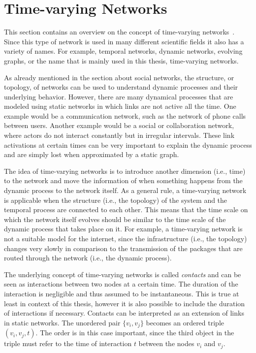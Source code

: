 \section{Time-varying Networks}
\label{sec:time-varying-networks}

This section contains an overview on the concept of time-varying networks~\cite{Holme2012, Holme2015}.
Since this type of network is used in many different scientific fields it also has a variety of names.
For example, temporal networks, dynamic networks, evolving graphs, or the name that is mainly used in this thesis, time-varying networks.

As already mentioned in the section about social networks, the structure, or topology, of networks can be used to understand dynamic processes and their underlying behavior.
However, there are many dynamical processes that are modeled using static networks in which links are not active all the time.
One example would be a communication network, such as the network of phone calls between users.
Another example would be a social or collaboration network, where actors do not interact constantly but in irregular intervals.
These link activations at certain times can be very important to explain the dynamic process and are simply lost when approximated by a static graph.

The idea of time-varying networks is to introduce another dimension (i.e., time) to the network and move the information of when something happens from the dynamic process to the network itself.
As a general rule, a time-varying network is applicable when the structure (i.e., the topology) of the system and the temporal process are connected to each other.
This means that the time scale on which the network itself evolves should be similar to the time scale of the dynamic process that takes place on it.
For example, a time-varying network is not a suitable model for the internet, since the infrastructure (i.e., the topology) changes very slowly in comparison to the transmission of the packages that are routed through the network (i.e., the dynamic process).

The underlying concept of time-varying networks is called \emph{contacts} and can be seen as interactions between two nodes at a certain time.
The duration of the interaction is negligible and thus assumed to be instantaneous.
This is true at least in context of this thesis, however it is also possible to include the duration of interactions if necessary.
Contacts can be interpreted as an extension of links in static networks.
The unordered pair \( \{v_{i}, v_{j}\} \) becomes an ordered triple \( (v_{i}, v_{j}, t) \).
The order is in this case important, since the third object in the triple must refer to the time of interaction \(t\) between the nodes \( v_{i} \) and \( v_{j} \).

